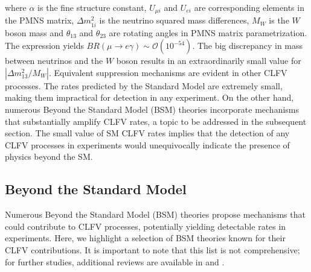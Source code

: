 where $\alpha$ is the fine structure constant, $U_{\mu i}$ and $U_{ei}$ are corresponding elements in the PMNS matrix, $\Delta m_{1i}^2$ is the neutrino squared mass differences, $M_W$ is the $W$ boson mass and $\theta_{13}$ and $\theta_{23}$ are rotating angles in PMNS matrix parametrization. The expression yields $B R(\mu \rightarrow e \gamma) \sim \mathcal{O}(10^{-54})$. The big discrepancy in mass between neutrinos and the $W$ boson results in an extraordinarily small value for $|\Delta m_{13}^2/M_W|$. Equivalent suppression mechanisms are evident in other CLFV processes. The rates predicted by the Standard Model are extremely small, making them impractical for detection in any experiment. On the other hand, numerous Beyond the Standard Model (BSM) theories incorporate mechanisms that substantially amplify CLFV rates, a topic to be addressed in the subsequent section. The small value of SM CLFV rates implies that the detection of any CLFV processes in experiments would unequivocally indicate the presence of physics beyond the SM.
\subsection{Beyond the Standard Model}
Numerous Beyond the Standard Model (BSM) theories propose mechanisms that could contribute to CLFV processes, potentially yielding detectable rates in experiments. Here, we highlight a selection of BSM theories known for their CLFV contributions. It is important to note that this list is not comprehensive; for further studies, additional reviews are available in \cite{clfv_signorelli} and \cite{universe8060299}.
